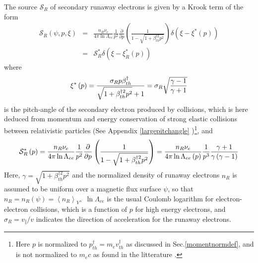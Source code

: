 The source $\mathcal{S}_{R}$ of secondary runaway electrons is given by a
Krook term of the form \cite{ros97}
\begin{eqnarray}
\mathcal{S}_{R}\left( \psi ,p,\xi \right) &=&\frac{n_{R}\nu _{e}}{4\pi \ln
\Lambda _{ee}}\frac{1}{p^{2}}\frac{\partial }{\partial p}\left( \frac{1}{1-%
\sqrt{1+\beta _{th}^{\dag 2}p^{2}}}\right) \delta \left( \xi -\xi ^{*}\left(
p\right) \right)  \nonumber \\
&=&\mathcal{S}_{R}^{*}\delta \left( \xi -\xi _{R}^{*}\left( p\right) \right)
\end{eqnarray}
where
\begin{equation}
\xi ^{*}\left( p\right) =\frac{\sigma _{R}p\beta _{th}^{\dag }}{\sqrt{%
1+\beta _{th}^{\dag 2}p^{2}}+1}=\sigma _{R}\sqrt{\frac{\gamma -1}{\gamma +1}}
\label{ksistar}
\end{equation}
is the pitch-angle of the secondary electron produced by collisions, which
is here deduced from momentum and energy conservation of strong elastic
collisions between relativistic particles (See Appendix \ref{largepitchangle}
)\footnote{%
Here $p$ is normalized to $p_{th}^{\dag }=m_{e}v_{th}^{\dag }$ as discussed
in Sec.\ref{momentnormdef}, and is not normalized to $m_{e}c$ as found in
the litterature \cite{ros97}.}, and
\begin{equation}
\mathcal{S}_{R}^{*}\left( p\right) =\frac{n_{R}\nu _{e}}{4\pi \ln \Lambda
_{ee}}\frac{1}{p^{2}}\frac{\partial }{\partial p}\left( \frac{1}{1-\sqrt{%
1+\beta _{th}^{\dag 2}p^{2}}}\right) =\frac{n_{R}\nu _{e}}{4\pi \ln \Lambda
_{ee}\left( p\right) }\frac{1}{p^{3}}\frac{\gamma +1}{\gamma \left( \gamma
-1\right) }  \label{sstarr}
\end{equation}
Here, $\gamma =\sqrt{1+\beta _{th}^{\dag 2}p^{2}}$ and the normalized
density of runaway electrons $n_{R}$ is assumed to be uniform over a
magnetic flux surface $\psi $, so that $n_{R}=n_{R}\left( \psi \right)
=\left\langle n_{R}\right\rangle _{V},$ $\ln \Lambda _{ee}$ is the usual
Coulomb logarithm for electron-electron collisions, which is a function of $%
p $ for high energy electrons, and $\sigma _{R}=v_{\Vert }/v$ indicates the
direction of acceleration for the runaway electrons.

